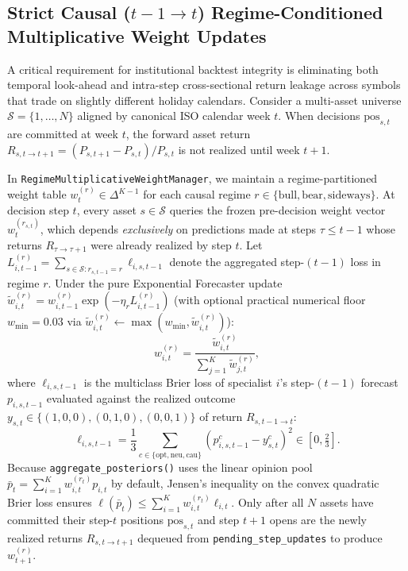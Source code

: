 \documentclass[10pt,a4paper,twocolumn]{article}
\begin{document}
\subsection{Strict Causal ($t-1 \to t$) Regime-Conditioned Multiplicative Weight Updates}

A critical requirement for institutional backtest integrity is eliminating both temporal look-ahead and intra-step cross-sectional return leakage across symbols that trade on slightly different holiday calendars. Consider a multi-asset universe $\mathcal{S} = \{1, \dots, N\}$ aligned by canonical ISO calendar week $t$. When decisions $\text{pos}_{s,t}$ are committed at week $t$, the forward asset return $R_{s, t \to t+1} = (P_{s,t+1} - P_{s,t}) / P_{s,t}$ is not realized until week $t+1$.

In \texttt{RegimeMultiplicativeWeightManager}, we maintain a regime-partitioned weight table $w_t^{(r)} \in \Delta^{K-1}$ for each causal regime $r \in \{\text{bull}, \text{bear}, \text{sideways}\}$. At decision step $t$, every asset $s \in \mathcal{S}$ queries the frozen pre-decision weight vector $w_t^{(r_{s,t})}$, which depends \emph{exclusively} on predictions made at steps $\tau \le t-1$ whose returns $R_{\tau \to \tau+1}$ were already realized by step $t$. Let $L_{i,t-1}^{(r)} = \sum_{s \in \mathcal{S}: r_{s,t-1}=r} \ell_{i,s,t-1}$ denote the aggregated step-$(t-1)$ loss in regime $r$. Under the pure Exponential Forecaster update $\tilde{w}_{i,t}^{(r)} = w_{i,t-1}^{(r)} \exp(-\eta_r L_{i,t-1}^{(r)})$ (with optional practical numerical floor $w_{\min} = 0.03$ via $\tilde{w}_{i,t}^{(r)} \leftarrow \max(w_{\min}, \tilde{w}_{i,t}^{(r)})$):
\begin{equation}
  w_{i,t}^{(r)} = \frac{\tilde{w}_{i,t}^{(r)}}{\sum_{j=1}^K \tilde{w}_{j,t}^{(r)}},
  \label{eq:causal_mwu}
\end{equation}
where $\ell_{i,s,t-1}$ is the multiclass Brier loss \cite{brier1950verification} of specialist $i$'s step-$(t-1)$ forecast $p_{i,s,t-1}$ evaluated against the realized outcome $y_{s,t} \in \{(1,0,0), (0,1,0), (0,0,1)\}$ of return $R_{s, t-1 \to t}$:
\begin{equation}
  \ell_{i,s,t-1} = \frac{1}{3} \sum_{c \in \{\text{opt},\text{neu},\text{cau}\}} \!\left(p_{i,s,t-1}^c - y_{s,t}^c\right)^2 \in \left[0, \tfrac{2}{3}\right].
  \label{eq:brier}
\end{equation}
Because \texttt{aggregate\_posteriors()} uses the linear opinion pool $\bar{p}_t = \sum_{i=1}^K w_{i,t}^{(r_t)} p_{i,t}$ by default, Jensen's inequality on the convex quadratic Brier loss ensures $\ell(\bar{p}_t) \le \sum_{i=1}^K w_{i,t}^{(r_t)} \ell_{i,t}$. Only after all $N$ assets have committed their step-$t$ positions $\text{pos}_{s,t}$ and step $t+1$ opens are the newly realized returns $R_{s,t \to t+1}$ dequeued from \texttt{pending\_step\_updates} to produce $w_{t+1}^{(r)}$.
\end{document}
